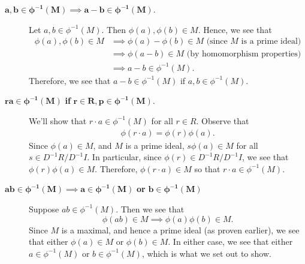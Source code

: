 \begin{prf}
\begin{enumerate}
\begin{itemize}
\begin{description}
                    \item[$\bm{a, b \in \phi^{-1}(M)\implies a-b \in \phi^{-1}(M)}$.] 
                    Let $a, b \in \phi^{-1}(M)$. Then $\phi(a), \phi(b) \in M$.
                    Hence, we see that 
                    \begin{align*}
                        \phi(a), \phi(b) \in M & \implies \phi(a) - \phi(b) \in M \text{ (since } M \text{ is a prime ideal)}\\
                        & \implies \phi(a - b) \in M \text{ (by homomorphism properties)}\\
                        & \implies a - b \in \phi^{-1}(M).
                    \end{align*}
                    Therefore, we see that $a - b \in \phi^{-1}(M)$ if $a, b \in
                    \phi^{-1}(M)$.  
        
                    \item[$\bm{ra \in \phi^{-1}(M)}$ \textbf{if} $\bm{r \in R, p \in \phi^{-1}(M)}$.] 
                    We'll show that $r \cdot a \in \phi^{-1}(M)$ for all
                    $r \in R$. Observe that 
                    \begin{align*}
                        \phi(r\cdot a) = \phi(r)\phi(a).
                    \end{align*}
                    Since $\phi(a) \in M$, and $M$ is a prime ideal, $s\phi(a) \in M$
                    for all $s \in D^{-1}R/D^{-1}I$. In particular, since $\phi(r) \in D^{-1}R/D^{-1}I$, we
                    see that $\phi(r)\phi(a) \in M$. Therefore, $\phi(r \cdot a)
                    \in M$ so that $r\cdot a \in \phi^{-1}(M)$.
        
                    \item[$\bm{ab \in \phi^{-1}(M) \implies a \in \phi^{-1}(M)}$ \textbf{or} $\bm{b \in \phi^{-1}(M)}$]
                    Suppose $ab \in \phi^{-1}(M)$. Then we see that 
                    \[ 
                        \phi(ab) \in M \implies \phi(a)\phi(b) \in M.
                    \]
                    Since $M$ is a maximal, and hence a prime ideal (as
                    proven earlier), we see that either $\phi(a)
                    \in M$ or $\phi(b) \in M$. In either case, we see that
                    either $a \in \phi^{-1}(M)$ or $b \in \phi^{-1}(M)$, which
                    is what we set out to show.
    

\end{description}
\end{itemize}
\end{enumerate}
\end{prf}

